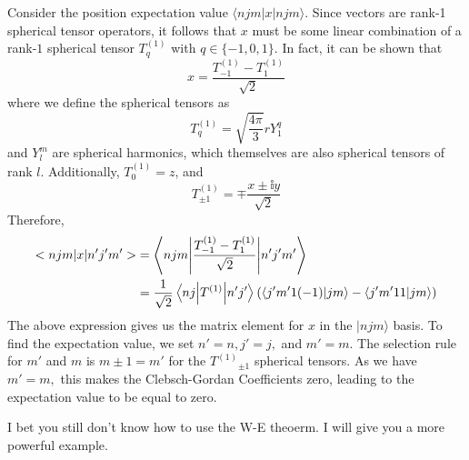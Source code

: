 \documentclass{article}
\begin{document}
	
	Consider the position expectation value $\langle njm|x|njm\rangle $. Since vectors are rank-1 spherical tensor operators, it follows that $x$ must be some linear combination of a rank-$1$ spherical tensor $T_{q}^{(1)}$ with $q\in \{-1,0,1\}$. In fact, it can be shown that
	\begin{equation*}
		x=\frac{T_{-1}^{(1)} -T_{1}^{(1)}}{\sqrt{2}}
	\end{equation*}
	where we define the spherical tensors as
	\begin{equation*}
		T_{q}^{(1)} =\sqrt{\frac{4\pi }{3}} rY_{1}^{q}
	\end{equation*}
	and $Y_{l}^{m}$ are spherical harmonics, which themselves are also spherical tensors of rank $l$. Additionally, $T_{0}^{(1)} =z$, and
	\begin{equation*}
		T_{\pm 1}^{(1)} =\mp \frac{x\pm \mathbb{i} y}{\sqrt{2}}
	\end{equation*}
	Therefore,
	\begin{equation*}
		\begin{aligned}
			< njm|x|n'j'm'>  & =\mel**{njm}{\frac{T_{-1}^{(1)} -T_{1}^{(1)}}{\sqrt{2}}}{n'j'm'}\\
			& =\frac{1}{\sqrt{2}}\mel**{nj}{T^{( 1)}}{n'j'}\left(\bra{j'm'1( -1)}\ket{jm} -\bra{j'm'11}\ket{jm}\right)
		\end{aligned}
	\end{equation*}
	The above expression gives us the matrix element for $x$ in the $|njm\rangle $ basis. To find the expectation value, we set $n'=n,j'=j,$ and $m'=m.$ The selection rule for $m'$ and $m$ is $m\pm 1=m'$ for the $T^{(1)}{}_{\pm 1}$ spherical tensors. As we have $m'=m,$ this makes the Clebsch-Gordan Coefficients zero, leading to the expectation value to be equal to zero.
	
	
	
	I bet you still don't know how to use the W-E theoerm. I will give you a more powerful example. 
	
\end{document}
